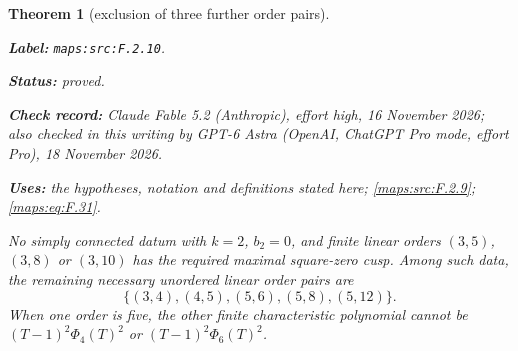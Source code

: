 \documentclass[11pt,a4paper]{article}
\newtheorem{theorem}{Theorem}[section]
\theoremstyle{definition}
\newcommand{\StatementRecord}[4]{\par\smallskip\begingroup\upshape\raggedright\noindent\textbf{Label:} \nolinkurl{#1}.\par\noindent\textbf{Status:} #2.\par\noindent\textbf{Check record:} #3.\par\noindent\textbf{Uses:} #4.\par\endgroup\smallskip}
\newcommand{\CurrentChecker}{GPT-6 Astra (OpenAI, ChatGPT Pro mode, effort Pro), 18 November 2026}
\begin{document}
\begin{theorem}[exclusion of three further order pairs]\label{maps:src:F.2.10}
\StatementRecord{maps:src:F.2.10}{proved}{Claude Fable 5.2 (Anthropic), effort high, 16 November 2026; also checked in this writing by \CurrentChecker}{the hypotheses, notation and definitions stated here; \cref{maps:src:F.2.9}; \cref{maps:eq:F.31}}


No simply connected datum with $k=2$, $b_2=0$, and finite linear orders
$(3,5)$, $(3,8)$ or $(3,10)$ has the required maximal
square-zero cusp.  Among such data, the
remaining necessary unordered linear order pairs are
\[
 \{(3,4),(4,5),(5,6),(5,8),(5,12)\}.
 \tag{F.30}\label{maps:eq:F.30}
\]
When one order is five, the other finite characteristic
polynomial cannot be $(T-1)^2\Phi_4(T)^2$ or
$(T-1)^2\Phi_6(T)^2$.

\end{theorem}
\end{document}
